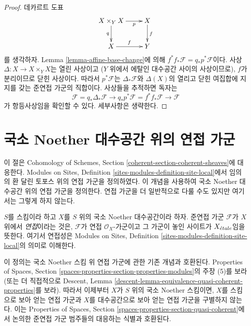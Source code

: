 \begin{proof}
데카르트 도표
$$
\xymatrix{
X \times_Y X \ar[r]_-p \ar[d]_q & X \ar[d]^f \\
X \ar[r]^f & Y
}
$$
를 생각하자. Lemma \ref{lemma-affine-base-change}에 의해
$f^*f_*\mathcal{F} = q_*p^*\mathcal{F}$이다. 사상
$\Delta : X \to X \times_Y X$는 열린 사상이고
($Y$ 위에서 에탈인 대수공간 사이의 사상이므로), $f$가 분리이므로
닫힌 사상이다. 따라서 $p^*\mathcal{F}$는
$\Delta_*\mathcal{F}$와 $\Delta(X)$의 열리고 닫힌 여집합에 지지를
갖는 준연접 가군의 직합이다. 사상들을 추적하면 독자는
$$
\mathcal{F} = q_*\Delta_*\mathcal{F} \to
q_*p^*\mathcal{F} = f^*f_*\mathcal{F} \to
\mathcal{F}
$$
가 항등사상임을 확인할 수 있다. 세부사항은 생략한다.
\end{proof}



\section{국소 Noether 대수공간 위의 연접 가군}
\label{section-coherent}

\noindent
이 절은 Cohomology of Schemes, Section
\ref{coherent-section-coherent-sheaves}에 대응한다. Modules on Sites,
Definition \ref{sites-modules-definition-site-local}에서 임의의 환 달린
토포스 위의 연접 가군을 정의하였다. 이 개념을 사용하여 국소 Noether
대수공간 위의 연접 가군을 정의한다. 연접 가군을 더 일반적으로
다룰 수도 있지만 여기서는 그렇게 하지 않는다.

\begin{definition}
\label{definition-coherent}
$S$를 스킴이라 하고 $X$를 $S$ 위의 국소 Noether 대수공간이라 하자.
준연접 가군 $\mathcal{F}$가 $X$ 위에서 {\it 연접}이라는 것은,
$\mathcal{F}$가 연접 $\mathcal{O}_X$-가군이고 그 가군이 놓인 사이트가
$X_{\acute{e}tale}$임을 뜻한다. 여기서 연접성은 Modules on Sites, Definition
\ref{sites-modules-definition-site-local}의 의미로 이해한다.
\end{definition}

\noindent
이 정의는 국소 Noether 스킴 위 연접 가군에 관한 기존 개념과
호환된다. Properties of Spaces, Section
\ref{spaces-properties-section-properties-modules}의 주장 (5)를 보라
(또는 더 직접적으로 Descent, Lemma
\ref{descent-lemma-equivalence-quasi-coherent-properties}를 보라).
따라서 이제부터 $X$가 $S$ 위의 국소 Noether 스킴이면, $X$를
스킴으로 보아 얻는 연접 가군과 $X$를 대수공간으로 보아 얻는 연접 가군을
구별하지 않는다. 이는 Properties of Spaces, Section
\ref{spaces-properties-section-quasi-coherent}에서 논의한 준연접 가군
범주들의 대응하는 식별과 호환된다.

